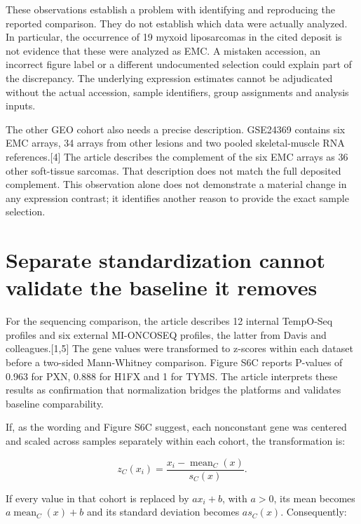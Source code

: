 \documentclass[11pt]{article}
\begin{document}
These observations establish a problem with identifying and reproducing the reported comparison. They do not establish which data were actually analyzed. In particular, the occurrence of 19 myxoid liposarcomas in the cited deposit is not evidence that these were analyzed as EMC. A mistaken accession, an incorrect figure label or a different undocumented selection could explain part of the discrepancy. The underlying expression estimates cannot be adjudicated without the actual accession, sample identifiers, group assignments and analysis inputs.\par

The other GEO cohort also needs a precise description. GSE24369 contains six EMC arrays, 34 arrays from other lesions and two pooled skeletal-muscle RNA references.[4] The article describes the complement of the six EMC arrays as 36 other soft-tissue sarcomas. That description does not match the full deposited complement. This observation alone does not demonstrate a material change in any expression contrast; it identifies another reason to provide the exact sample selection.\par

\section*{Separate standardization cannot validate the baseline it removes}

For the sequencing comparison, the article describes 12 internal TempO-Seq profiles and six external MI-ONCOSEQ profiles, the latter from Davis and colleagues.[1,5] The gene values were transformed to z-scores within each dataset before a two-sided Mann-Whitney comparison. Figure S6C reports P-values of 0.963 for PXN, 0.888 for H1FX and 1 for TYMS. The article interprets these results as confirmation that normalization bridges the platforms and validates baseline comparability.\par

If, as the wording and Figure S6C suggest, each nonconstant gene was centered and scaled across samples separately within each cohort, the transformation is:\par

\[z_C(x_i) = \frac{x_i-\operatorname{mean}_C(x)}{s_C(x)}.\]

If every value in that cohort is replaced by \(a x_i + b\), with \(a > 0\), its mean becomes \(a\operatorname{mean}_C(x)+b\) and its standard deviation becomes \(a s_C(x)\). Consequently:\par
\end{document}

